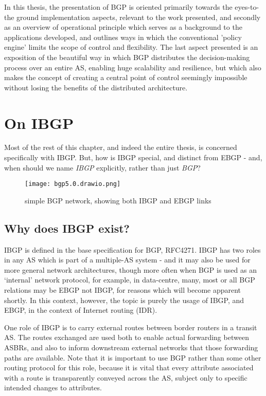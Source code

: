 In this thesis, the presentation of BGP is oriented primarily towards the
eyes-to-the ground implementation aspects, relevant to the work presented, and
secondly as an overview of operational principle which serves as a background
to the applications developed, and outlines ways in which the conventional
'policy engine' limits the scope of control and flexibility.  The last aspect
presented is an exposition of the beautiful way in which BGP distributes the
decision-making process over  an entire AS, enabling huge scalability and
resilience, but which also makes the concept of creating a central point of
control seemingly impossible without losing the benefits of the distributed
architecture.
\section{On IBGP}
Most of the rest of this chapter, and indeed the entire thesis, is concerned
specifically with IBGP.
But, how is IBGP special, and distinct from EBGP - and, when should we name
\emph{IBGP} explicitly, rather than just \emph{BGP}?

\begin{figure}[H]
    \centering
    \texttt{[image: bgp5.0.drawio.png]}
    \caption{simple BGP network, showing both IBGP and EBGP links}
    \label{fig:diag5.0}
\end{figure}
\subsection{Why does IBGP exist?}
IBGP is defined in the base specification for BGP, RFC4271\cite{rfc4271}.
IBGP has two roles in any AS which is part of a multiple-AS system - and it may
also be used for more general network architectures, though more often when BGP
is used as an `internal' network protocol, for example, in data-centre, many,
most or all BGP relations may be EBGP not IBGP, for reasons which will become
apparent shortly.  In this context, however, the topic is purely the usage of
IBGP, and EBGP, in the context of Internet routing (IDR).

One role of IBGP is to carry external routes between border routers in a
transit AS.  The routes exchanged are used both to enable actual forwarding
between ASBRs, and also to inform downstream external networks that those
forwarding paths are available.  Note that it is important to use BGP rather
than some other routing protocol for this role, because it is vital that every
attribute associated with a route is transparently conveyed across the AS,
subject only to specific intended changes to attributes.


